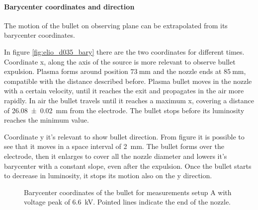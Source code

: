 \paragraph{Barycenter coordinates and direction}
The motion of the bullet on observing plane can be extrapolated from its barycenter coordinates.

In figure \ref{fig:elio_d035_bary} there are the two coordinates for different times.
Coordinate x, along the axis of the source is more relevant to observe bullet expulsion. Plasma forms around position $\SI{73}{\milli\meter}$ and the nozzle ends at $\SI{85}{\milli\meter}$, compatible with the distance described before. Plasma bullet moves in the nozzle with a certain velocity, until it reaches the exit and propagates in the air more rapidly. In air the bullet travels until it reaches a maximum x, covering a distance of \SI{26.08(2)}{\milli\meter} from the electrode. The bullet stops before its luminosity reaches the minimum value.

Coordinate y it's relevant to show bullet direction. From figure it is possible to see that  it moves in a space interval of \SI{2}{\milli\meter}. The bullet forms over the electrode, then it enlarges to cover all the nozzle diameter and lowers it's barycenter with a constant slope, even after the expulsion. Once the bullet starts to decrease in luminosity, it stops its motion also on the y direction.
\begin{figure}
 \centering
 \hfill
 \caption{Barycenter coordinates of the bullet for measurements setup A with voltage peak of \SI{6.6}{\kilo\volt}. Pointed lines indicate the end of the nozzle.}
 \label{fig:elio_d035_I}
\end{figure}

